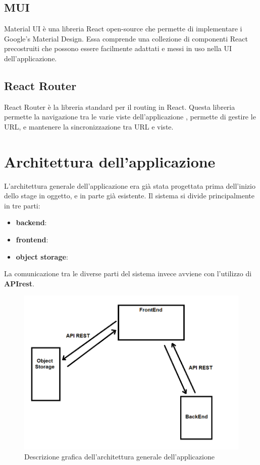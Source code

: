 \subsection*{MUI}
Material UI è una libreria React open-source che permette di implementare i Google's Material Design. Essa comprende una collezione di componenti React precostruiti che possono
essere facilmente adattati e messi in uso nella UI dell'applicazione.

\subsection*{React Router}
React Router è la libreria standard per il routing in React. Questa libreria permette la navigazione tra le varie viste dell'applicazione , permette di gestire le URL, e mantenere
la sincronizzazione tra URL e viste.

\section{Architettura dell'applicazione}
L'architettura generale dell'applicazione era già stata progettata prima dell'inizio dello stage in oggetto, e in parte già esistente. Il sistema si divide principalmente in tre parti:
\begin{itemize}
  \item \textbf{backend}:
  \item \textbf{frontend}:
  \item \textbf{object storage}:
\end{itemize}

La comunicazione tra le diverse parti del sistema invece avviene con l'utilizzo di \textbf{APIrest}.

\begin{figure}[H]
  \centering
  \includegraphics[width=\textwidth]{immagini/architettura-generale.png}
  \caption{Descrizione grafica dell'architettura generale dell'applicazione}
\end{figure}

